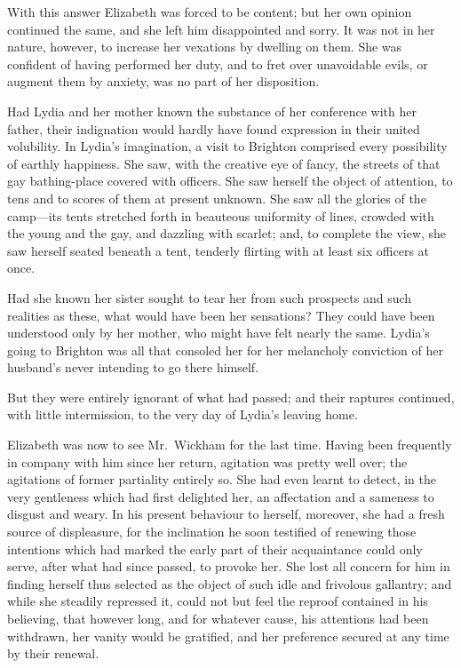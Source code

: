 \documentclass[12pt,english]{book}
\begin{document}
With this answer Elizabeth was forced to be content; but her own opinion
continued the same, and she left him disappointed and sorry. It was
not in her nature, however, to increase her vexations by dwelling
on them. She was confident of having performed her duty, and to fret
over unavoidable evils, or augment them by anxiety, was no part of
her disposition.

Had Lydia and her mother known the substance of her conference with
her father, their indignation would hardly have found expression in
their united volubility. In Lydia's imagination, a visit to Brighton
comprised every possibility of earthly happiness. She saw, with the
creative eye of fancy, the streets of that gay bathing-place covered
with officers. She saw herself the object of attention, to tens and
to scores of them at present unknown. She saw all the glories of the
camp\mbox{---}its tents stretched forth in beauteous uniformity of
lines, crowded with the young and the gay, and dazzling with scarlet;
and, to complete the view, she saw herself seated beneath a tent,
tenderly flirting with at least six officers at once.

Had she known her sister sought to tear her from such prospects and
such realities as these, what would have been her sensations? They
could have been understood only by her mother, who might have felt
nearly the same. Lydia's going to Brighton was all that consoled her
for her melancholy conviction of her husband's never intending to
go there himself.

But they were entirely ignorant of what had passed; and their raptures
continued, with little intermission, to the very day of Lydia's leaving
home.

Elizabeth was now to see Mr.\ Wickham for the last time. Having been
frequently in company with him since her return, agitation was pretty
well over; the agitations of former partiality entirely so. She had
even learnt to detect, in the very gentleness which had first delighted
her, an affectation and a sameness to disgust and weary. In his present
behaviour to herself, moreover, she had a fresh source of displeasure,
for the inclination he soon testified of renewing those intentions
which had marked the early part of their acquaintance could only serve,
after what had since passed, to provoke her. She lost all concern
for him in finding herself thus selected as the object of such idle
and frivolous gallantry; and while she steadily repressed it, could
not but feel the reproof contained in his believing, that however
long, and for whatever cause, his attentions had been withdrawn, her
vanity would be gratified, and her preference secured at any time
by their renewal.
\end{document}
